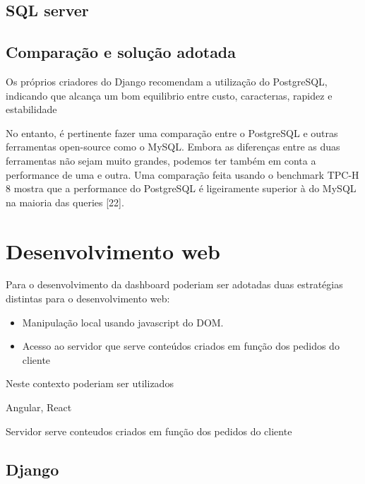 \subsection{SQL server}



\subsection{Comparação e solução adotada}


Os próprios criadores do Django recomendam a utilização do PostgreSQL, indicando que alcança um bom equilibrio entre custo, caracterıas, rapidez e estabilidade




No entanto, é pertinente fazer uma comparação entre o PostgreSQL e
outras ferramentas open-source como o MySQL. Embora as diferenças entre
as duas ferramentas não sejam muito grandes, podemos ter também em conta
a performance de uma e outra. Uma comparação feita usando o benchmark
TPC-H 8 mostra que a performance do PostgreSQL é ligeiramente superior à
do MySQL na maioria das queries [22].



\newpage
\section{Desenvolvimento web}



Para o desenvolvimento da dashboard poderiam ser adotadas duas estratégias distintas para o desenvolvimento web: 

\begin{itemize}
	\item Manipulação local usando javascript do DOM. 
	
	\item Acesso ao servidor que serve conteúdos criados em função dos pedidos do cliente
	
\end{itemize}



Neste contexto poderiam ser utilizados 


Angular, React

Servidor serve conteudos criados em função dos pedidos do cliente 



\subsection{Django}


